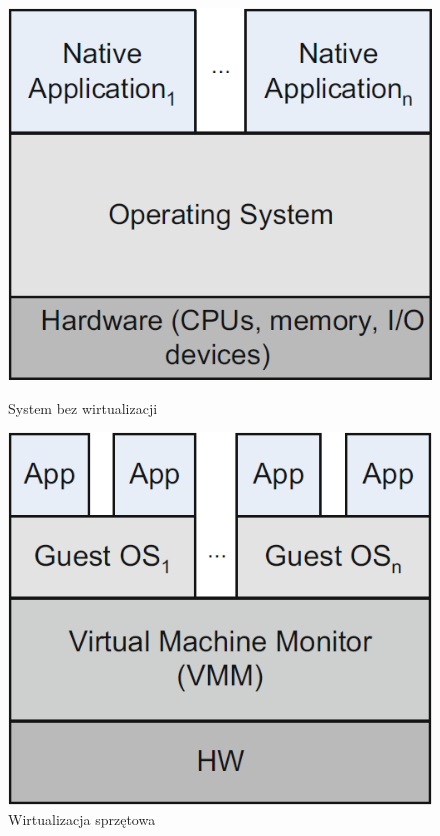 \documentclass[12pt,a4paper,twoside,titlepage,openright]{book}
\begin{document}
\begin{figure}[h!]
	\centering
	\begin{minipage}[t]{0.33\textwidth}
		\includegraphics[width=\textwidth]{non-virtualized-system.png}
		\caption{System bez wirtualizacji \cite{ccSpringer}}
		\label{fig:non-virtualized-system}
	\end{minipage}
\hspace*{60px}
	\begin{minipage}[t]{0.33\textwidth}
		\includegraphics[width=\textwidth]{system-level-vm.png}
		\caption{Wirtualizacja sprzętowa \cite{ccSpringer}}
		\label{fig:system-level-vm}
	\end{minipage}
	\hfill
\end{figure}
\end{document}
